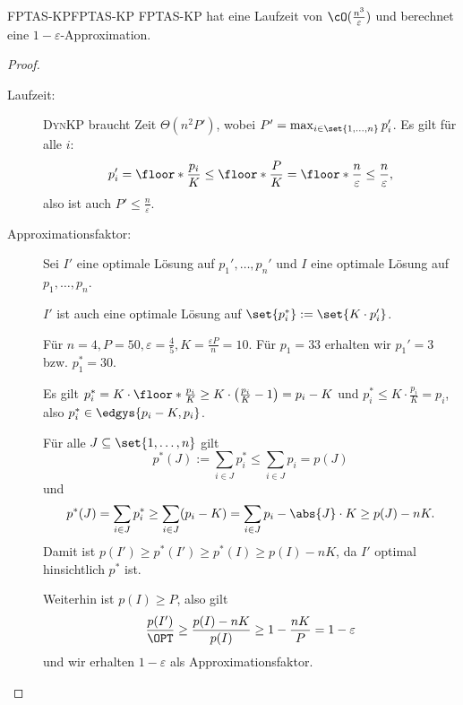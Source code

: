 \documentclass[language=ngerman,algolist]{TemplateLecture}
\begin{document}
\begin{thm}{FPTAS-KP}{FPTAS-KP}
    \textsc{FPTAS-KP} hat eine Laufzeit von $\cO(\frac{n^3}{\varepsilon})$ und berechnet eine $1-\varepsilon$-Approximation.
\end{thm}
\begin{proof}\leavevmode
    \begin{description}
        \item[Laufzeit:] \textsc{DynKP} braucht Zeit $\Theta(n^2 P')$, wobei $P' = \max_{i \in \set{1,\ldots,n}} p_i'$. Es gilt für alle $i$:
        \begin{equation*}
            p_i' = \floor*{\frac{p_i}{K}} \leq \floor*{\frac{P}{K}} = \floor*{\frac{n}{\varepsilon}} \leq \frac{n}{\varepsilon},
        \end{equation*}
        also ist auch $P' \leq \frac{n}{\varepsilon}$.
        \item[Approximationsfaktor:] Sei $I'$ eine optimale Lösung auf $p_1', \ldots, p_n'$ und $I$ eine optimale Lösung auf $p_1, \ldots, p_n$.
        
        $I'$ ist auch eine optimale Lösung auf $\set{p_i^*} := \set{K \cdot p_i'}$.
        \begin{expl}
            Für $n = 4, P = 50, \varepsilon = \frac{4}{5}, K = \frac{\varepsilon P}{n} = 10$. Für $p_1 = 33$ erhalten wir $p_1' = 3$ bzw. $p_1^* = 30$.
        \end{expl}

        Es gilt $p_i^* = K \cdot \floor*{\frac{p_i}{K}} \geq K \cdot \left( \frac{p_i}{K} - 1 \right) = p_i - K$ und $p_i^* \leq K \cdot \frac{p_i}{K} = p_i$, also $p_i^* \in \edgys{p_i - K, p_i}$.

        Für alle $J \subseteq \set{1,\ldots,n}$ gilt 
        \begin{equation*}
            p^*(J) := \sum_{i \in J} p_i^* \leq \sum_{i \in J} p_i = p(J)
        \end{equation*}
        und 
        \begin{equation*}
            p^*(J) = \sum_{i \in J} p_i^* \geq \sum_{i \in J} (p_i - K) = \sum_{i \in J} p_i - \abs{J} \cdot K \geq p(J) - nK.
        \end{equation*}
        Damit ist $p(I') \geq p^*(I') \geq p^*(I) \geq p(I) - nK$, da $I'$ optimal hinsichtlich $p^*$ ist.

        Weiterhin ist $p(I) \geq P$, also gilt 
        \begin{equation*}
            \frac{p(I')}{\OPT} \geq \frac{p(I) - nK}{p(I)} \geq 1 - \frac{nK}{P} = 1 - \varepsilon
        \end{equation*}
        und wir erhalten $1-\varepsilon$ als Approximationsfaktor.
    \end{description}
\end{proof}
\end{document}

